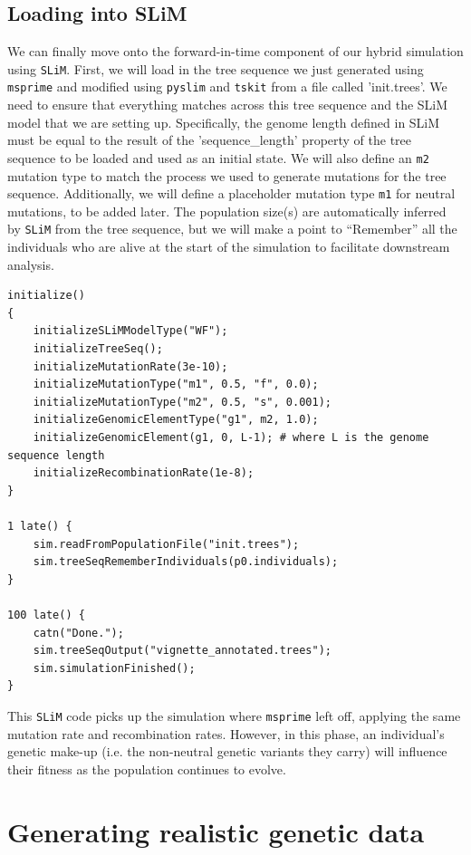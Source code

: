 \documentclass[12pt]{article}
\newcommand{\msprime}[0]{\texttt{msprime}\xspace}
\newcommand{\tskit}[0]{\texttt{tskit}\xspace}
\newcommand{\slim}[0]{\texttt{SLiM}\xspace}
\newcommand{\pyslim}[0]{\texttt{pyslim}\xspace}
\begin{document}
\subsection*{Loading into SLiM}

We can finally move onto the forward-in-time component of our hybrid simulation using \slim. First, we will load in the tree sequence we just
generated using \msprime and modified using \pyslim and \tskit from a file called 'init.trees'. We need to ensure that everything matches
across this tree sequence and the SLiM model that we are setting up. Specifically, the genome length defined in SLiM must be equal to the
result of the 'sequence_length' property of the tree sequence to be loaded and used as an initial state. We will also define an \verb|m2|
mutation type to match the process we used to generate mutations for the tree sequence. Additionally, we will define a placeholder mutation
type \verb|m1| for neutral mutations, to be added later. The population size(s) are automatically inferred by \slim from the tree sequence,
but we will make a point to ``Remember'' all the individuals who are alive at the start of the simulation to facilitate downstream analysis.

\begin{lstlisting}[language=slim]
initialize()
{
    initializeSLiMModelType("WF");
    initializeTreeSeq();
    initializeMutationRate(3e-10);
    initializeMutationType("m1", 0.5, "f", 0.0);
    initializeMutationType("m2", 0.5, "s", 0.001);
    initializeGenomicElementType("g1", m2, 1.0);
    initializeGenomicElement(g1, 0, L-1); # where L is the genome sequence length
    initializeRecombinationRate(1e-8);
}

1 late() { 
    sim.readFromPopulationFile("init.trees");
    sim.treeSeqRememberIndividuals(p0.individuals);
}

100 late() {
    catn("Done.");
    sim.treeSeqOutput("vignette_annotated.trees");
    sim.simulationFinished();
}
\end{lstlisting}

This \slim code picks up the simulation where \msprime left off, applying the same mutation rate and recombination rates. However, in this phase,
an individual's genetic make-up (i.e. the non-neutral genetic variants they carry) will influence their fitness as the population continues to evolve.

\section{Generating realistic genetic data}
\end{document}
